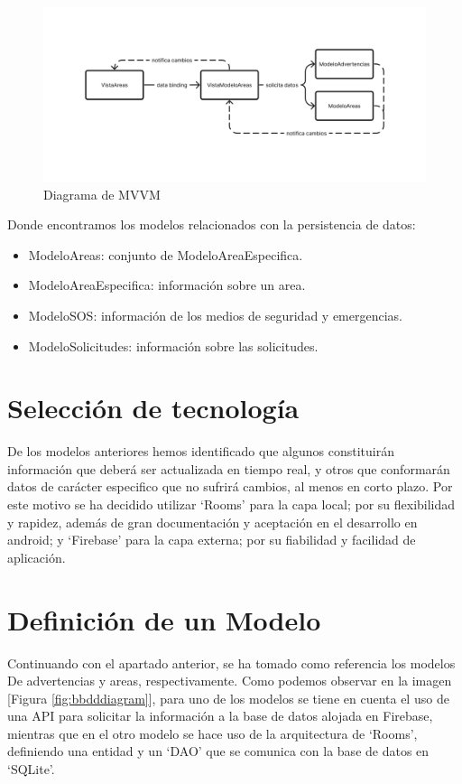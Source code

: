 \documentclass{article}
\begin{document}
    \begin{figure}[H]
        \centerline{\includegraphics[scale=0.4]{areasdiagram}}
        \caption{Diagrama de MVVM}
        \label{fig:areasdiagram}
    \end{figure}
    
    Donde encontramos los modelos relacionados con la persistencia de datos:

    \begin{itemize}
        \item ModeloAreas: conjunto de ModeloAreaEspecifica.
        \item ModeloAreaEspecifica: información sobre un area.
        \item ModeloSOS: información de los medios de seguridad y emergencias.
        \item ModeloSolicitudes: información sobre las solicitudes.
    \end{itemize}
    
        
    \section{Selección de tecnología}
    De los modelos anteriores hemos identificado que algunos constituirán
     información que deberá ser actualizada en tiempo real, y otros que conformarán
     datos de carácter especifico que no sufrirá cambios, al menos en corto plazo.
     Por este motivo se ha decidido utilizar \enquote*{Rooms} para la capa local; por
     su flexibilidad y rapidez, además de gran documentación y aceptación en el
     desarrollo en android; y \enquote*{Firebase} para la capa externa; por su fiabilidad
     y facilidad de aplicación.
    
    \section{Definición de un Modelo}
    Continuando con el apartado anterior, se ha tomado como referencia los modelos De
     advertencias y areas, respectivamente. Como podemos observar en la imagen
     [Figura \ref{fig:bbdddiagram}], para uno de los modelos se tiene en cuenta el uso
     de una API para solicitar la información a la base de datos alojada en Firebase,
     mientras que en el otro modelo se hace uso de la arquitectura de \enquote*{Rooms},
     definiendo una entidad y un \enquote*{DAO} que se comunica con la base de datos en
     \enquote*{SQLite}.
\end{document}
